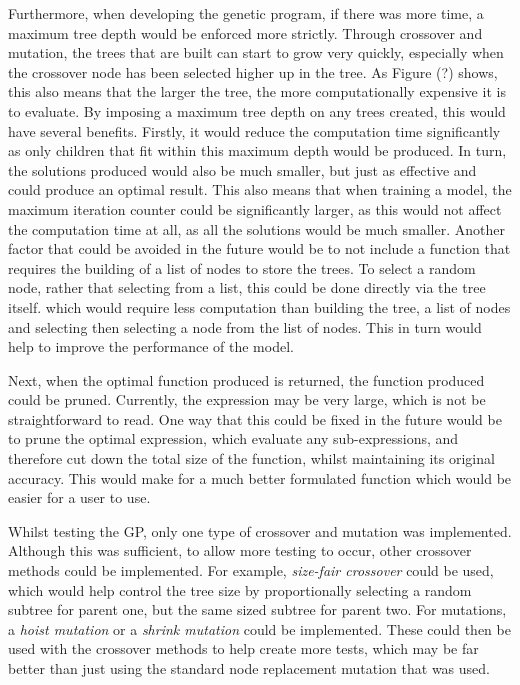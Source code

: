 \documentclass[11pt]{article}
\begin{document}
Furthermore, when developing the genetic program, if there was more time, a maximum tree depth would be enforced more strictly. Through crossover and mutation, the trees that are built can start to grow very quickly, especially when the crossover node has been selected higher up in the tree. As Figure (?) shows, this also means that the larger the tree, the more computationally expensive it is to evaluate. By imposing a maximum tree depth on any trees created, this would have several benefits. Firstly, it would reduce the computation time significantly as only children that fit within this maximum depth would be produced. In turn, the solutions produced would also be much smaller, but just as effective and could produce an optimal result. This also means that when training a model, the maximum iteration counter could be significantly larger, as this would not affect the computation time at all, as all the solutions would be much smaller.
Another factor that could be avoided in the future would be to not include a function that requires the building of a list of nodes to store the trees. To select a random node, rather that selecting from a list, this could be done directly via the tree itself. which would require less computation than building the tree, a list of nodes and selecting then selecting a node from the list of nodes. This in turn would help to improve the performance of the model.  

Next, when the optimal function produced is returned, the function produced could be pruned. Currently, the expression may be very large, which is not be straightforward to read. One way that this could be fixed in the future would be to prune the optimal expression, which evaluate any sub-expressions, and therefore cut down the total size of the function, whilst maintaining its original accuracy. This would make for a much better formulated function which would be easier for a user to use. 

Whilst testing the GP, only one type of crossover and mutation was implemented. Although this was sufficient, to allow more testing to occur, other crossover methods could be implemented. For example, \textit{size-fair crossover} could be used, which would help control the tree size by proportionally selecting a random subtree for parent one, but the same sized subtree for parent two. For mutations, a \textit{hoist mutation} or a \textit{shrink mutation} could be implemented. These could then be used with the crossover methods to help create more tests, which may be far better than just using the standard node replacement mutation that was used. 
\end{document}
